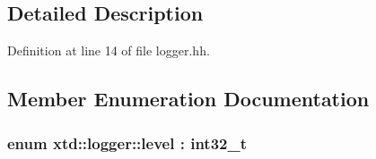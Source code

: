 \subsection{Detailed Description}


Definition at line 14 of file logger.\-hh.



\subsection{Member Enumeration Documentation}
\hypertarget{classxtd_1_1logger_a250ce2f143da181d7149a1556da2a6f1}{
\subsubsection[{level}]{\setlength{\rightskip}{0pt plus 5cm}enum {\bf xtd\-::logger\-::level} \-: int32\-\_\-t\hspace{0.3cm}{\ttfamily [strong]}}}\label{classxtd_1_1logger_a250ce2f143da181d7149a1556da2a6f1}

